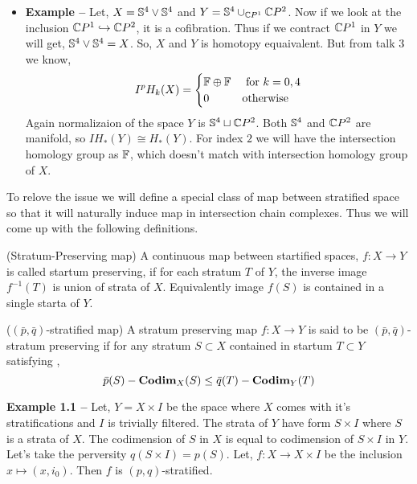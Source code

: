 \documentclass[11pt]{article}
\begin{document}
\begin{itemize}
    \item[] \textbf{Example -- } Let, $X = \mathbb{S}^4 \vee \mathbb{S}^4$ and $Y = \mathbb{S}^4 \cup_{\mathbb{C} P^1 } \mathbb{C} P^2$. Now if we look at the inclusion $\mathbb{C} P^1 \hookrightarrow \mathbb{C} P^2$, it is a cofibration. Thus if we contract $\mathbb{C} P^1$ in $Y$ we will get, $\mathbb{S}^4 \vee \mathbb{S}^4 = X$. So, $X$ and $Y$ is homotopy equaivalent. But from talk $3$ we know, \begin{align*}
        I^{p}H_{k}(X) = \begin{cases}
            \mathbb{F} \oplus \mathbb{F}  & \text{ for } k = 0,4 \\
            0 & \text{otherwise}
        \end{cases}
    \end{align*}
    Again normalizaion of the space $Y$ is $\mathbb{S}^4 \sqcup \mathbb{C} P^2$. Both $\mathbb{S}^4$ and $\mathbb{C} P^2$ are manifold, so $IH_{\ast}(Y) \cong H_{\ast}(Y)$. For index $2$ we will have the intersection homology group as $\mathbb{F}$, which doesn't match with intersection homology group of $X$.
\end{itemize}

\noindent To relove the issue we will define a special class of map between stratified space so that it will naturally induce map in intersection chain complexes. Thus we will come up with the following definitions. 

\begin{Def}{(Stratum-Preserving map)}{}
     A continuous map between startified spaces, $f : X \to Y$ is called startum preserving, if for each stratum $T$ of $Y$, the inverse image $f^{-1}(T)$ is union of strata of $X$. Equivalently image $f(S)$ is contained in a single starta of $Y$.
\end{Def}

\begin{Def}{($(\bar{p},\bar{q})$-stratified map)}{}
    A stratum preserving map $f : X \to Y$ is said to be $(\bar{p},\bar{q})$-stratum preserving if for any stratum $S\subset X$ contained in startum $T \subset Y$ satisfying , $$\bar{p}(S)-\mathbf{Codim}_X(S) \leq \bar{q}(T) - \mathbf{Codim}_{Y}(T)$$
\end{Def}

\noindent \textbf{Example \textcolor{darkcerulean}{1.1} -- } Let, $Y = X\times I$ be the space where $X$ comes with it's stratifications and $I$ is trivially filtered. The strata of $Y$ have form $S \times I$ where $S$ is a strata of $X$. The codimension of $S$ in $X$ is equal to codimension of $S \times I$ in $Y$. Let's take the perversity $q(S\times I) = p(S)$. Let, $f : X \to X \times I$ be the inclusion $x \mapsto (x,i_0)$. Then $f$ is $(p,q)$-stratified.
\end{document}
